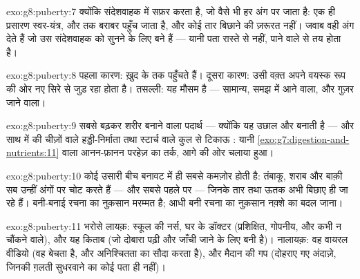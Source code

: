 \begin{solution}{exo:g8:puberty:7}
क्योंकि संदेशवाहक  में सफ़र करता है, जो वैसे भी हर अंग पर जाता है:
एक ही प्रसारण स्वर-यंत्र,  और  तक बराबर पहुँच जाता है, और कोई
तार बिछाने की ज़रूरत नहीं। जवाब वही अंग देते हैं जो उस संदेशवाहक को
सुनने के लिए बने हैं --- यानी पता रास्ते से नहीं, पाने वाले से तय होता
है।
\end{solution}

\begin{solution}{exo:g8:puberty:8}
पहला कारण: ख़ुद  के   तक पहुँचते हैं। दूसरा कारण:
 उसी वक़्त अपने वयस्क रूप की ओर नए सिरे से जुड़ रहा होता है।
तसल्ली: यह मौसम है --- सामान्य, समझ में आने वाला, और गुज़र जाने वाला।
\end{solution}

\begin{solution}{exo:g8:puberty:9}
सबसे बढ़कर शरीर बनाने वाला पदार्थ --- क्योंकि यह उछाल  और 
बनाती है --- और साथ में  की चीज़ों वाले हड्डी-निर्माता तथा स्टार्च
वाले कुल से टिकाऊ : यानी
\cref{exo:g7:digestion-and-nutrients:11} वाला आनन-फ़ानन परहेज़ का तर्क,
आगे की ओर चलाया हुआ।
\end{solution}

\begin{solution}{exo:g8:puberty:10}
कोई उसारी बीच बनावट में ही सबसे कमज़ोर होती है: तंबाकू, शराब और बाक़ी सब
उन्हीं अंगों पर चोट करते हैं --- और सबसे पहले  पर --- जिनके तार
तथा ऊतक अभी बिछाए ही जा रहे हैं। बनी-बनाई रचना का नुक़सान मरम्मत है;
आधी बनी रचना का नुक़सान नक़्शे का बदल जाना।
\end{solution}

\begin{solution}{exo:g8:puberty:11}
भरोसे लायक़: स्कूल की नर्स, घर के डॉक्टर (प्रशिक्षित, गोपनीय, और कभी न
चौंकने वाले), और यह किताब (जो दोबारा पढ़ी और जाँची जाने के लिए बनी है)।
नालायक़: वह वायरल वीडियो (वह बेचता है, और अनिश्चितता का सौदा करता है),
और मैदान की गप (दोहराए गए अंदाज़े, जिनकी ग़लती सुधरवाने का कोई पता ही
नहीं)।
\end{solution}

